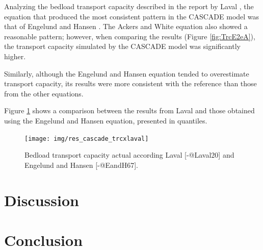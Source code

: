 \documentclass[
]{book}
\begin{document}
Analyzing the bedload transport capacity described in the report by Laval \citeyearpar{Laval20}, the equation that produced the most consistent pattern in the CASCADE model was that of Engelund and Hansen \citeyearpar{EandH67}. The Ackers and White equation \citeyearpar{AandW73} also showed a reasonable pattern; however, when comparing the results (Figure \ref{fig:TrcE2eA}), the transport capacity simulated by the CASCADE model was significantly higher.

Similarly, although the Engelund and Hansen equation \citeyearpar{EandH67} tended to overestimate transport capacity, its results were more consistent with the reference than those from the other equations.

Figure \ref{fig:EHxLaval20} shows a comparison between the results from Laval \citeyearpar{Laval20} and those obtained using the Engelund and Hansen \citeyearpar{EandH67} equation, presented in quantiles.

\begin{figure}
\texttt{[image: img/res\_cascade\_trcxlaval]} \caption{Bedload transport capacity actual according Laval [-@Laval20] and Engelund and Hansen [-@EandH67].}\label{fig:EHxLaval20}
\end{figure}

\chapter{Discussion}\label{discussion}

\chapter{Conclusion}\label{conclusion}

  
\end{document}

